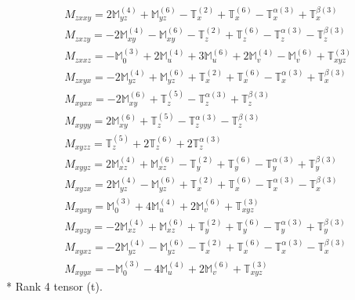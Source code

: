 \documentclass[fleqn,8pt,landscape]{jsarticle}
\begin{document}
\begin{align*}
& M_{zxxy} = 2 \mathbb{M}_{yz}^{(4)} + \mathbb{M}_{yz}^{(6)} - \mathbb{T}_{x}^{(2)} + \mathbb{T}_{x}^{(6)} - \mathbb{T}_{x}^{\alpha(3)} + \mathbb{T}_{x}^{\beta(3)} \\
& M_{zxzy} = - 2 \mathbb{M}_{xy}^{(4)} - \mathbb{M}_{xy}^{(6)} - \mathbb{T}_{z}^{(2)} + \mathbb{T}_{z}^{(6)} - \mathbb{T}_{z}^{\alpha(3)} - \mathbb{T}_{z}^{\beta(3)} \\
& M_{zxxz} = - \mathbb{M}_{0}^{(3)} + 2 \mathbb{M}_{u}^{(4)} + 3 \mathbb{M}_{u}^{(6)} + 2 \mathbb{M}_{v}^{(4)} - \mathbb{M}_{v}^{(6)} + \mathbb{T}_{xyz}^{(3)} \\
& M_{zxyx} = - 2 \mathbb{M}_{yz}^{(4)} + \mathbb{M}_{yz}^{(6)} + \mathbb{T}_{x}^{(2)} + \mathbb{T}_{x}^{(6)} - \mathbb{T}_{x}^{\alpha(3)} + \mathbb{T}_{x}^{\beta(3)} \\
& M_{xyxx} = - 2 \mathbb{M}_{xy}^{(6)} + \mathbb{T}_{z}^{(5)} - \mathbb{T}_{z}^{\alpha(3)} + \mathbb{T}_{z}^{\beta(3)} \\
& M_{xyyy} = 2 \mathbb{M}_{xy}^{(6)} + \mathbb{T}_{z}^{(5)} - \mathbb{T}_{z}^{\alpha(3)} - \mathbb{T}_{z}^{\beta(3)} \\
& M_{xyzz} = \mathbb{T}_{z}^{(5)} + 2 \mathbb{T}_{z}^{(6)} + 2 \mathbb{T}_{z}^{\alpha(3)} \\
& M_{xyyz} = 2 \mathbb{M}_{xz}^{(4)} + \mathbb{M}_{xz}^{(6)} - \mathbb{T}_{y}^{(2)} + \mathbb{T}_{y}^{(6)} - \mathbb{T}_{y}^{\alpha(3)} + \mathbb{T}_{y}^{\beta(3)} \\
& M_{xyzx} = 2 \mathbb{M}_{yz}^{(4)} - \mathbb{M}_{yz}^{(6)} + \mathbb{T}_{x}^{(2)} + \mathbb{T}_{x}^{(6)} - \mathbb{T}_{x}^{\alpha(3)} - \mathbb{T}_{x}^{\beta(3)} \\
& M_{xyxy} = \mathbb{M}_{0}^{(3)} + 4 \mathbb{M}_{u}^{(4)} + 2 \mathbb{M}_{v}^{(6)} + \mathbb{T}_{xyz}^{(3)} \\
& M_{xyzy} = - 2 \mathbb{M}_{xz}^{(4)} + \mathbb{M}_{xz}^{(6)} + \mathbb{T}_{y}^{(2)} + \mathbb{T}_{y}^{(6)} - \mathbb{T}_{y}^{\alpha(3)} + \mathbb{T}_{y}^{\beta(3)} \\
& M_{xyxz} = - 2 \mathbb{M}_{yz}^{(4)} - \mathbb{M}_{yz}^{(6)} - \mathbb{T}_{x}^{(2)} + \mathbb{T}_{x}^{(6)} - \mathbb{T}_{x}^{\alpha(3)} - \mathbb{T}_{x}^{\beta(3)} \\
& M_{xyyx} = - \mathbb{M}_{0}^{(3)} - 4 \mathbb{M}_{u}^{(4)} + 2 \mathbb{M}_{v}^{(6)} + \mathbb{T}_{xyz}^{(3)}
\end{align*}
* Rank 4 tensor (t).
\end{document}
